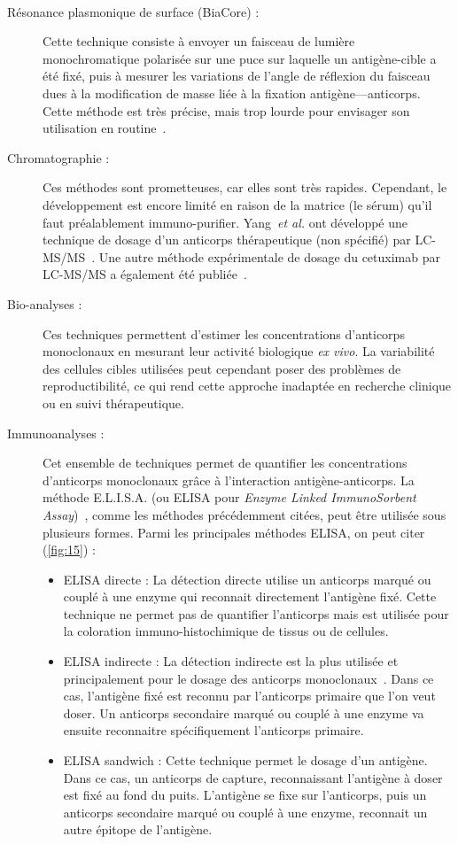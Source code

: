 \begin{description}
\item[Résonance plasmonique de surface (BiaCore\textsuperscript{\textregistered}) :] Cette technique consiste à envoyer un faisceau de lumière monochromatique polarisée sur une puce sur laquelle un antigène-cible a été fixé, puis à mesurer les variations de l'angle de réflexion du faisceau dues à la modification de masse liée à la fixation antigène–--anticorps. Cette méthode est très précise, mais trop lourde pour envisager son utilisation en routine~\citep{REF92}.
\item[Chromatographie :] Ces méthodes sont prometteuses, car elles sont très rapides. Cependant, le développement est encore limité en raison de la matrice (le sérum) qu'il faut préalablement immuno-purifier. Yang~\textit{et al.} ont développé une technique de dosage d'un anticorps thérapeutique (non spécifié) par LC-MS/MS~\citep{REF93}. Une autre méthode expérimentale de dosage du cetuximab par LC-MS/MS a également été publiée~\citep{REF94}.
\item[Bio-analyses :] Ces techniques permettent d'estimer les concentrations d'anticorps monoclonaux en mesurant leur activité biologique \textit{ex vivo}. La variabilité des cellules cibles utilisées peut cependant poser des problèmes de reproductibilité, ce qui rend cette approche inadaptée en recherche clinique ou en suivi thérapeutique.
\item[Immunoanalyses : ] Cet ensemble de techniques permet de quantifier les concentrations d'anticorps monoclonaux grâce à l'interaction antigène-anticorps. La méthode E.L.I.S.A. (ou ELISA pour \textit{Enzyme Linked ImmunoSorbent Assay})~\citep{REF95}, comme les méthodes précédemment citées, peut être utilisée sous plusieurs formes. Parmi les principales méthodes ELISA, on peut citer (\ref{fig:15}) :
\begin{itemize}
\item ELISA directe : La détection directe utilise un anticorps marqué ou couplé à une enzyme qui reconnait directement l'antigène fixé. Cette technique ne permet pas de quantifier l'anticorps mais est utilisée pour la coloration immuno-histochimique de tissus ou de cellules.
\item ELISA indirecte : La détection indirecte est la plus utilisée et principalement pour le dosage des anticorps monoclonaux~\citep{REF96}. Dans ce cas, l'antigène fixé est reconnu par l'anticorps primaire que l'on veut doser. Un anticorps secondaire marqué ou couplé à une enzyme va ensuite reconnaitre spécifiquement l'anticorps primaire.
\item ELISA sandwich : Cette technique permet le dosage d'un antigène. Dans ce cas, un anticorps de capture, reconnaissant l'antigène à doser est fixé au fond du puits. L'antigène se fixe sur l'anticorps, puis un anticorps secondaire marqué ou couplé à une enzyme, reconnait un autre épitope de l'antigène.
\end{itemize}
\end{description}


